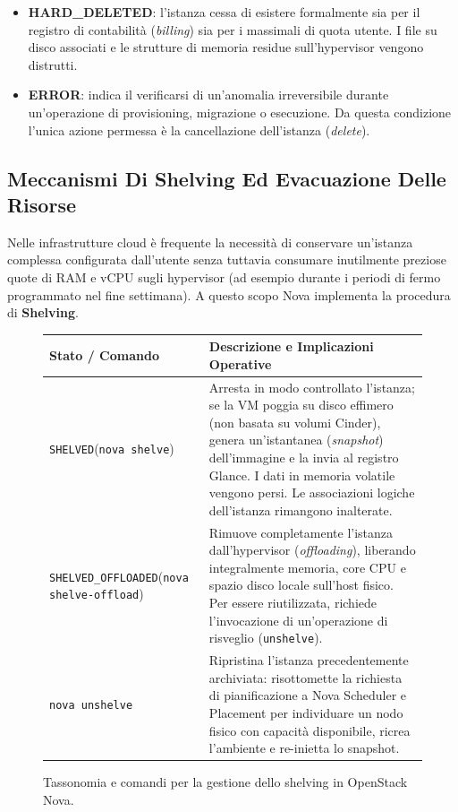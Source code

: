 \documentclass[11pt, a4paper]{article}
\begin{document}
\begin{itemize}[leftmargin=*]
    \item \textbf{HARD\_DELETED}: l'istanza cessa di esistere formalmente sia per il registro di contabilità (\emph{billing}) sia per i massimali di quota utente. I file su disco associati e le strutture di memoria residue sull'hypervisor vengono distrutti.
    \item \textbf{ERROR}: indica il verificarsi di un'anomalia irreversibile durante un'operazione di provisioning, migrazione o esecuzione. Da questa condizione l'unica azione permessa è la cancellazione dell'istanza (\emph{delete}).
\end{itemize}

\subsection{Meccanismi Di Shelving Ed Evacuazione Delle Risorse}

Nelle infrastrutture cloud è frequente la necessità di conservare un'istanza complessa configurata dall'utente senza tuttavia consumare inutilmente preziose quote di RAM e vCPU sugli hypervisor (ad esempio durante i periodi di fermo programmato nel fine settimana). A questo scopo Nova implementa la procedura di \textbf{Shelving}.

\begin{figure}[H]
    \centering
    \begin{tabularx}{\textwidth}{p{4.2cm}X}
        \toprule
        \textbf{Stato / Comando} & \textbf{Descrizione e Implicazioni Operative} \\
        \midrule
        \texttt{SHELVED}\newline(\texttt{nova shelve}) & Arresta in modo controllato l'istanza; se la VM poggia su disco effimero (non basata su volumi Cinder), genera un'istantanea (\emph{snapshot}) dell'immagine e la invia al registro Glance. I dati in memoria volatile vengono persi. Le associazioni logiche dell'istanza rimangono inalterate. \\
        \addlinespace
        \texttt{SHELVED\_OFFLOADED}\newline(\texttt{nova shelve-offload}) & Rimuove completamente l'istanza dall'hypervisor (\emph{offloading}), liberando integralmente memoria, core CPU e spazio disco locale sull'host fisico. Per essere riutilizzata, richiede l'invocazione di un'operazione di risveglio (\texttt{unshelve}). \\
        \addlinespace
        \texttt{nova unshelve} & Ripristina l'istanza precedentemente archiviata: risottomette la richiesta di pianificazione a Nova Scheduler e Placement per individuare un nodo fisico con capacità disponibile, ricrea l'ambiente e re-inietta lo snapshot. \\
        \bottomrule
    \end{tabularx}
    \caption{Tassonomia e comandi per la gestione dello shelving in OpenStack Nova.}
\end{figure}
\end{document}
